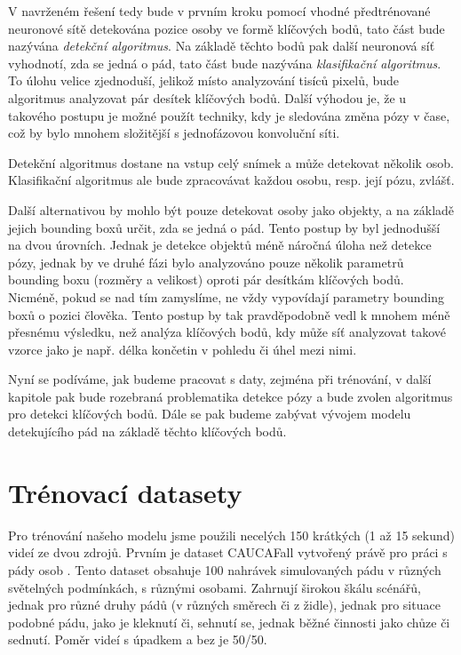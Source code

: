 V navrženém řešení tedy bude v prvním kroku pomocí vhodné předtrénované
neuronové sítě detekována pozice osoby ve formě klíčových bodů, tato část bude
nazývána \textit{detekční algoritmus}. Na základě těchto bodů pak další
neuronová síť vyhodnotí, zda se jedná o pád, tato část bude nazývána
\textit{klasifikační algoritmus}. To úlohu velice zjednoduší, jelikož místo
analyzování tisíců pixelů, bude algoritmus analyzovat pár desítek klíčových bodů. Další
výhodou je, že u takového postupu je možné použít techniky, kdy je sledována
změna pózy v čase, což by bylo mnohem složitější s jednofázovou konvoluční
síti.

Detekční algoritmus dostane na vstup celý snímek a může detekovat několik osob.
Klasifikační algoritmus ale bude zpracovávat každou osobu, resp. její pózu,
zvlášť.

Další alternativou by mohlo být pouze detekovat osoby jako objekty, a na
základě jejich bounding boxů určit, zda se jedná o pád. Tento postup by byl
jednodušší na dvou úrovních. Jednak je detekce objektů méně náročná úloha než
detekce pózy, jednak by ve druhé fázi bylo analyzováno pouze několik parametrů
bounding boxu (rozměry a velikost) oproti pár desítkám klíčových bodů. Nicméně,
pokud se nad tím zamyslíme, ne vždy vypovídají parametry bounding boxů o pozici
člověka. Tento postup by tak pravděpodobně vedl k mnohem méně přesnému
výsledku, než analýza klíčových bodů, kdy může síť analyzovat takové vzorce
jako je např. délka končetin v pohledu či úhel mezi nimi.

Nyní se podíváme, jak budeme pracovat s daty, zejména při trénování, v další
kapitole pak bude rozebraná problematika detekce pózy a bude zvolen algoritmus
pro detekci klíčových bodů. Dále se pak budeme zabývat vývojem modelu
detekujícího pád na základě těchto klíčových bodů.

\section{Trénovací datasety}
\label{sec:TrainingData}

Pro trénování našeho modelu jsme použili necelých 150 krátkých (1 až 15 sekund)
videí ze dvou zdrojů. Prvním je dataset CAUCAFall vytvořený právě pro práci s
pády osob \cite{caucafall}. Tento dataset obsahuje 100 nahrávek simulovaných
pádu v různých světelných podmínkách, s různými osobami. Zahrnují širokou škálu
scénářů, jednak pro různé druhy pádů (v různých směrech či z židle), jednak pro
situace podobné pádu, jako je kleknutí či, sehnutí se, jednak běžné činnosti
jako chůze či sednutí. Poměr videí s úpadkem a bez je 50/50.

